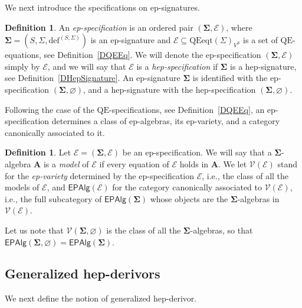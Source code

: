 \documentclass[a4paper, reqno
]{amsart}
\newcommand{\sig}[1]{\mathbf{#1}}             %
\newcommand{\spec}[1]{\boldsymbol{\mathcal{#1}}} %
\newcommand{\QE}{\mathrm{QE}}
\theoremstyle{plain}
\theoremstyle{definition}
\newtheorem{definition}[theorem]{Definition}
\begin{document}
We next introduce the specifications on ep-signatures.

\begin{definition}\label{DEpSpec}
An \emph{ep-specification} is an ordered pair $(\sig{\Sigma},\mathcal{E})$, where $\sig{\Sigma}=(S,\Sigma,\mathrm{def}^{(S,\Sigma)})$ is an ep-signature and $\mathcal{E}\subseteq\mathrm{QEeqt}(\Sigma)_{V^{S}}$ is a set of $\QE$-equations, see Definition~\ref{DQEEq}.
We will denote the ep-specification $(\sig{\Sigma},\mathcal{E})$ simply by $\spec{E}$, and we will say that $\spec{E}$ is a \emph{hep-specification} if $\sig{\Sigma}$ is a hep-signature, see Definition~\ref{DHepSignature}.
An ep-signature $\sig{\Sigma}$ is identified with the ep-specification $(\sig{\Sigma},\varnothing)$, and a hep-signature with the hep-specification $(\sig{\Sigma},\varnothing)$.
\end{definition}

Following the case of the $\QE$-specifications, see Definition~\ref{DQEEq}, an ep-specification determines a class of ep-algebras, its ep-variety, and a category canonically associated to it.

\begin{definition}\label{DEpVariety}
Let $\spec{E}=(\sig{\Sigma},\mathcal{E})$ be an ep-specification.
We will say that a $\sig{\Sigma}$-algebra $\mathbf{A}$ is a \emph{model} of $\spec{E}$ if every equation of $\mathcal{E}$ holds in $\mathbf{A}$.
We let $\mathcal{V}(\spec{E})$ stand for the \emph{ep-variety} determined by the ep-specification $\spec{E}$, i.e., the class of all the models of $\spec{E}$, and $\mathsf{EPAlg}(\spec{E})$ for the category canonically associated to $\mathcal{V}(\spec{E})$, i.e., the full subcategory of $\mathsf{EPAlg}(\sig{\Sigma})$ whose objects are the $\sig{\Sigma}$-algebras in $\mathcal{V}(\spec{E})$.
\end{definition}

Let us note that $\mathcal{V}(\sig{\Sigma},\varnothing)$ is the class of all the $\sig{\Sigma}$-algebras, so that $\mathsf{EPAlg}(\sig{\Sigma},\varnothing)=\mathsf{EPAlg}(\sig{\Sigma})$.

\subsection{Generalized hep-derivors}\label{SGenHepDerivorsDef}

We next define the notion of generalized hep-derivor.
\end{document}
